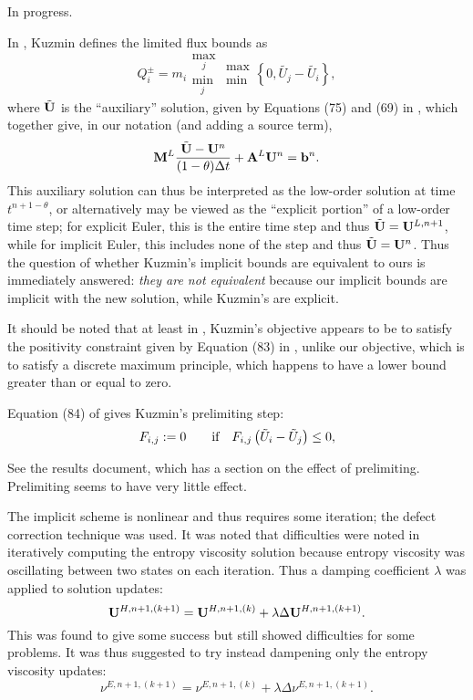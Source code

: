 \begin{enumerate}
In progress.

In \cite{kuzmin_FCT}, Kuzmin defines the limited flux bounds as
\[
  Q_i^\pm=m_i\substack{\max_j\\\min_j}\substack{\max\\\min}
    \left\{0,\tilde{U_j}-\tilde{U_i}\right\},
\]
where $\tilde{\mathbf{U}}$ is the ``auxiliary'' solution, given by Equations (75) and (69)
in \cite{kuzmin_FCT}, which together give, in our notation (and adding a source term),
\[
  \mathbf{M}^L\frac{\tilde{\mathbf{U}}-\mathbf{U}^n}{(1-\theta)\Delta t} + \mathbf{A}^L\mathbf{U}^n = \mathbf{b}^n.
\]
This auxiliary solution can thus be interpreted as the low-order solution at time
$t^{n+1-\theta}$, or alternatively may be viewed as the ``explicit portion'' of
a low-order time step; for explicit Euler, this is the entire time step and thus
$\tilde{\mathbf{U}}=\mathbf{U}^{L,n+1}$, while for implicit Euler, this includes none of the step
and thus $\tilde{\mathbf{U}}=\mathbf{U}^{n}$. Thus the question of whether Kuzmin's implicit bounds are
equivalent to ours is immediately answered: \emph{they are not equivalent} because
our implicit bounds are implicit with the new solution, while Kuzmin's are
explicit.

It should be noted that at least in \cite{kuzmin_FCT}, Kuzmin's objective
appears to be to satisfy the positivity constraint given by Equation (83)
in \cite{kuzmin_FCT}, unlike our objective, which is to satisfy a discrete
maximum principle, which happens to have a lower bound greater than or
equal to zero.

Equation (84) of \cite{kuzmin_FCT} gives Kuzmin's prelimiting step:
\[
  F_{i,j} := 0 \qquad \mbox{if}\quad F_{i,j} \left(\tilde{U}_i-\tilde{U}_j\right)\leq 0,
\]

See the results document, which has a section on the effect of prelimiting.
Prelimiting seems to have very little effect.

The implicit scheme is nonlinear and thus requires some iteration; the defect
correction technique was used. It was noted that difficulties were noted in
iteratively computing the entropy viscosity solution because entropy viscosity
was oscillating between two states on each iteration. Thus a damping coefficient
$\lambda$ was applied to solution updates:
\[
  \mathbf{U}^{H,n+1,(k+1)} = \mathbf{U}^{H,n+1,(k)} + \lambda\Delta\mathbf{U}^{H,n+1,(k+1)}.
\]
This was found to give some success but still showed difficulties for some
problems. It was thus suggested to try instead dampening only the entropy viscosity updates:
\[
  \nu^{E,n+1,(k+1)} = \nu^{E,n+1,(k)} + \lambda\Delta\nu^{E,n+1,(k+1)}.
\]
\end{enumerate}
